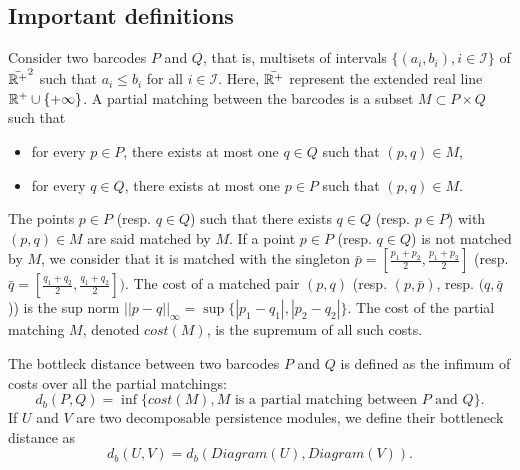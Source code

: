 \subsection{Important definitions}

\begin{definition}
    Consider two barcodes $P$ and $Q$, that is, multisets of intervals
    $\{(a_i, b_i), i \in \mathcal{I}\}$ of $\bar{\mathbb{R}^+}^2$ such that $a_i \le
    b_i$ for all $i \in \mathcal{I}$. Here, $\bar{\mathbb{R}^+}$ represent the
    extended real line $\mathbb{R}^+ \cup \{+\infty\}$. A partial matching between the
    barcodes is a subset $M \subset P \times Q$ such that
    \begin{itemize}
        \item for every $p \in P$, there exists at most one $q \in Q$ such that $(p, q) \in M$,
        \item for every $q \in Q$, there exists at most one $p \in P$ such that $(p, q) \in M$.
    \end{itemize}
    The points $p \in P$ (resp. $q \in Q$) such that there exists $q \in Q$
    (resp. $p \in P$) with $(p, q) \in M$ are said matched by $M$. If a point
    $p \in P$ (resp. $q \in Q$) is not matched by $M$, we consider that it is
    matched with the singleton $\bar{p} =
    [\frac{p_1+p_2}{2},\frac{p_1+p_2}{2}]$ (resp. $\bar{q} =
    [\frac{q_1+q_2}{2}, \frac{q_1+q_2}{2}])$. The cost of a matched pair $(p,
    q)$ (resp. $(p, \bar{p})$, resp. $(q, \bar{q}$)) is the sup norm $||p -
    q||_{\infty} = \sup\{|p_1 - q_1|, |p_2 - q_2|\}$. The cost of the partial matching $M$, denoted $cost(M)$, is the supremum of all such costs.
\end{definition}

\begin{definition}
    The bottleck distance between two barcodes $P$ and $Q$ is defined
    as the infimum of costs over all the partial matchings:
    $$d_b(P, Q) = \inf\{cost(M), M \text{ is a partial matching between }P
    \text{ and  }Q\}.$$ 
    If $U$ and $V$ are two decomposable persistence modules, we define their
    bottleneck distance as
    $$d_b(U, V) = d_b (Diagram (U), Diagram (V)).$$
\end{definition}

